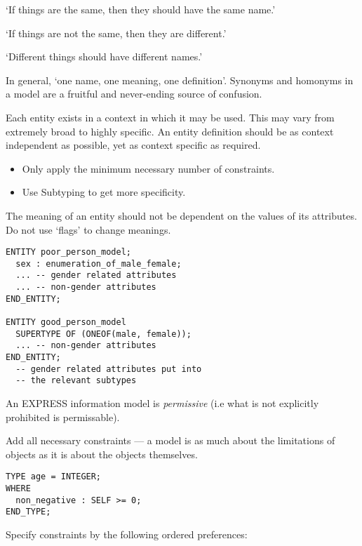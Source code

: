     `If things are the same, then they should have the same name.'

    `If things are not the same, then they are different.'

    `Different things should have different names.'

    In general, `one name, one meaning, one definition'. Synonyms and homonyms
in a model are a fruitful and never-ending source of confusion.


    Each entity exists in a context in which it may be used. This may vary from
extremely broad to highly specific. An entity definition should be as context
independent as possible, yet as context specific as required.

\begin{itemize}
\item Only apply the minimum necessary number of constraints.
\item Use Subtyping to get more specificity.
\end{itemize}



    The meaning of an entity should not be dependent on the values of its
attributes. Do not use `flags' to change meanings.
\begin{verbatim}
ENTITY poor_person_model;
  sex : enumeration_of_male_female;
  ... -- gender related attributes
  ... -- non-gender attributes
END_ENTITY;

ENTITY good_person_model
  SUPERTYPE OF (ONEOF(male, female));
  ... -- non-gender attributes
END_ENTITY;
  -- gender related attributes put into
  -- the relevant subtypes
\end{verbatim}


    An EXPRESS information model is \emph{permissive}
(i.e what is not explicitly prohibited is permissable).

    Add all necessary constraints --- a model is as much about the limitations
of objects as it is about the objects themselves.

\begin{verbatim}
TYPE age = INTEGER;
WHERE
  non_negative : SELF >= 0;
END_TYPE;
\end{verbatim}


    Specify constraints by the following ordered preferences:

